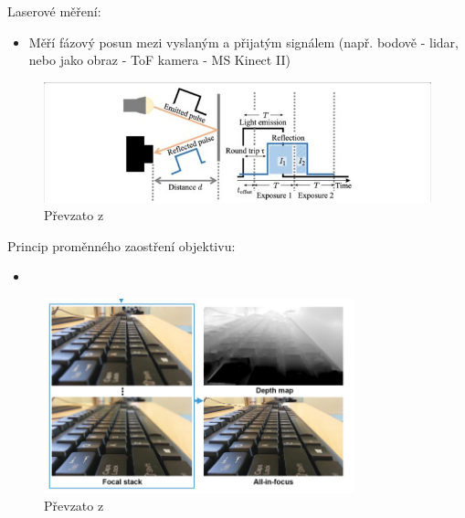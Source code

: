 % 

\begin{frame}
Laserové měření:
\begin{itemize}
\item Měří fázový posun mezi vyslaným a přijatým signálem (např. bodově - lidar, nebo jako obraz - ToF kamera - MS Kinect II)
\end{itemize}
	\begin{figure}[!ht]
	\centering
	\includegraphics[width = 1.0\textwidth]{./tof}
	\caption{Převzato z \cite{Kitano2017}}
	\end{figure}
\end{frame}




\begin{frame}
Princip proměnného zaostření objektivu:
\begin{itemize}
\item 
\end{itemize}
	\begin{figure}[!ht]
	\centering
	\includegraphics[width = 0.8\textwidth]{./fokus}
	\caption{Převzato z \cite{Suwajanakorn_2015_CVPR}}
	\end{figure}
\end{frame}

